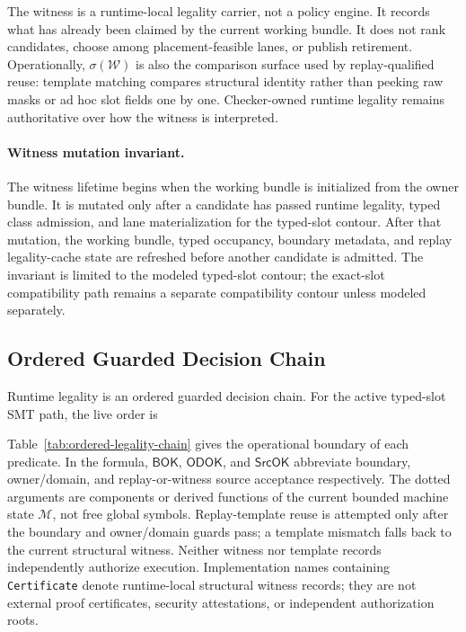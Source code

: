\documentclass[twocolumn]{article}
\begin{document}
The witness is a runtime-local legality carrier, not a policy engine. It records what has already been claimed by the current working bundle. It does not rank candidates, choose among placement-feasible lanes, or publish retirement. Operationally, \(\sigma(\mathcal{W})\) is also the comparison surface used by replay-qualified reuse: template matching compares structural identity rather than peeking raw masks or ad hoc slot fields one by one. Checker-owned runtime legality remains authoritative over how the witness is interpreted.

\paragraph{Witness mutation invariant.}
The witness lifetime begins when the working bundle is initialized from the owner bundle. It is mutated only after a candidate has passed runtime legality, typed class admission, and lane materialization for the typed-slot contour. After that mutation, the working bundle, typed occupancy, boundary metadata, and replay legality-cache state are refreshed before another candidate is admitted. The invariant is limited to the modeled typed-slot contour; the exact-slot compatibility path remains a separate compatibility contour unless modeled separately.


\subsection{Ordered Guarded Decision Chain}

Runtime legality is an ordered guarded decision chain. For the active typed-slot SMT path, the live order is



Table~\ref{tab:ordered-legality-chain} gives the operational boundary of each predicate.
In the formula, \(\mathsf{BOK}\), \(\mathsf{ODOK}\), and \(\mathsf{SrcOK}\) abbreviate boundary, owner/domain, and replay-or-witness source acceptance respectively. The dotted arguments are components or derived functions of the current bounded machine state \(\mathcal{M}\), not free global symbols. Replay-template reuse is attempted only after the boundary and owner/domain guards pass; a template mismatch falls back to the current structural witness. Neither witness nor template records independently authorize execution. Implementation names containing \texttt{Certificate} denote runtime-local structural witness records; they are not external proof certificates, security attestations, or independent authorization roots.
\end{document}
